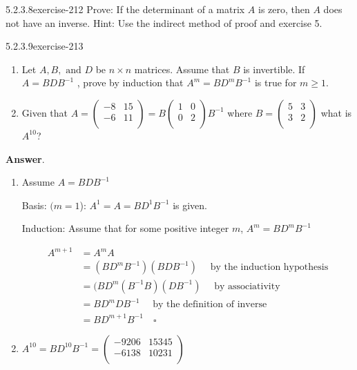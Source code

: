 \documentclass[twoside,10pt,]{book}
\numberwithin{equation}{section}
\begin{document}
\begin{divisionsolution}{5.2.3.8}{}{exercise-212}%
\hypertarget{p-1834}{}%
Prove: If the determinant of a matrix \(A\) is zero, then \(A\) does not have an inverse. Hint: Use the indirect method of proof and exercise 5.%
\end{divisionsolution}%
\begin{divisionsolution}{5.2.3.9}{}{exercise-213}%
\hypertarget{p-1835}{}%
\leavevmode%
\begin{enumerate}[label=(\alph*)]
\item\hypertarget{li-971}{}Let \(A, B, \textrm{ and } D\) be \(n\times n\) matrices. Assume that \(B\) is invertible. If \(A = B D B^{-1}\) , prove by induction that \(A^m= B D^m B^{-1}\) is true for \(m \geq  1\).%
\item\hypertarget{li-972}{}Given that \(A = \left(
\begin{array}{cc}
-8 & 15 \\
-6 & 11 \\
\end{array}
\right) = B \left(
\begin{array}{cc}
1 & 0 \\
0 & 2 \\
\end{array}
\right) B^{-1}\) where \(B=\left(
\begin{array}{cc}
5 & 3 \\
3 & 2 \\
\end{array}
\right)\) what is \(A^{10}\)?%
\end{enumerate}
%
\par\smallskip%
\noindent\textbf{Answer}.\quad%
\hypertarget{p-1836}{}%
\leavevmode%
\begin{enumerate}[label=(\alph*)]
\item\hypertarget{li-973}{}\hypertarget{p-1837}{}%
Assume \(A=B D B^{-1}\)%
\par
\hypertarget{p-1838}{}%
Basis:  \((m=1\)): \(A^{1}=A=B D^1 B^{-1} \) is given.%
\par
\hypertarget{p-1839}{}%
Induction: Assume that for some positive integer \(m\), \(A^m=BD^mB^{-1}\)%
\par
\hypertarget{p-1840}{}%
%
\begin{equation*}
\begin{split}
A^{m+1} &=A^mA\\
&=(B D^m B^{-1})(BDB^{-1})\quad \textrm{ by the induction hypothesis} \\
&=(BD^m(B^{-1} B ) (DB^{-1}) \quad \textrm{ by associativity} \\
&=B D^m  D B^{-1}  \quad \textrm{ by the definition of inverse}\\
&=B D^{m+1} B^{-1} \quad \square
\end{split}
\end{equation*}
%
\item\hypertarget{li-974}{}\(A^{10}=BD^{10}B^{-1}= \left(
\begin{array}{cc}
-9206 & 15345 \\
-6138 & 10231 \\
\end{array}
\right)\)%
\end{enumerate}
%
\end{divisionsolution}%
\end{document}
